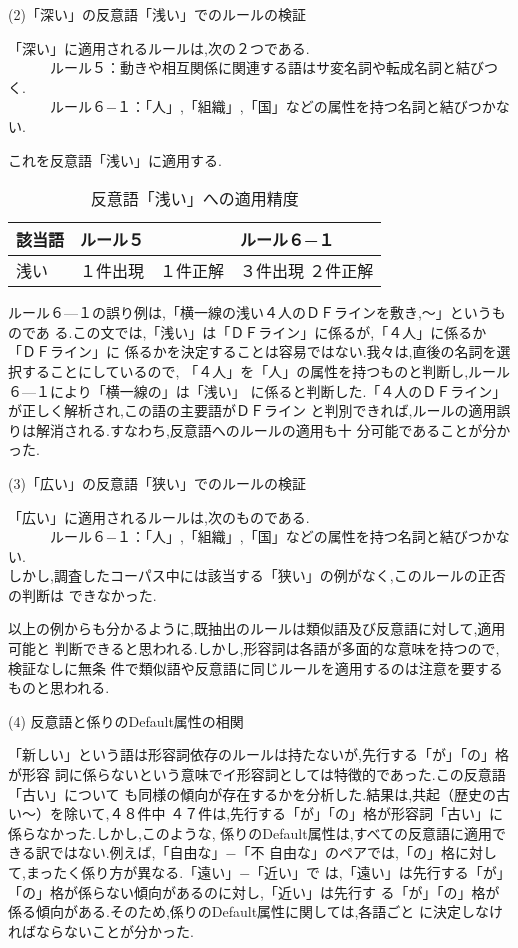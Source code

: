 \noindent
(2)「深い」の反意語「浅い」でのルールの検証

「深い」に適用されるルールは,次の２つである.\\
　　　ルール５：動きや相互関係に関連する語はサ変名詞や転成名詞と結びつく.\\
　　　ルール６−１：「人」,「組織」,「国」などの属性を持つ名詞と結びつかない.

これを反意語「浅い」に適用する.
\begin{table}[h]
\caption{反意語「浅い」への適用精度}
\begin{center}
  \begin{tabular}{|l|l|l|} \hline
    該当語 & ルール５ & ルール６−１\\ \hline
    浅い & １件出現　１件正解 & ３件出現 ２件正解\\ \hline
  \end{tabular}
\end{center}
\end{table}

ルール６—１の誤り例は,「横一線の浅い４人のＤＦラインを敷き,〜」というものであ
る.この文では,「浅い」は「ＤＦライン」に係るが,「４人」に係るか「ＤＦライン」に
係るかを決定することは容易ではない.我々は,直後の名詞を選択することにしているので,
「４人」を「人」の属性を持つものと判断し,ルール６—１により「横一線の」は「浅い」
に係ると判断した.「４人のＤＦライン」が正しく解析され,この語の主要語がＤＦライン
と判別できれば,ルールの適用誤りは解消される.すなわち,反意語へのルールの適用も十
分可能であることが分かった.
\vspace{.5\baselineskip}

\noindent
(3)「広い」の反意語「狭い」でのルールの検証

「広い」に適用されるルールは,次のものである.\\
　　　ルール６−１：「人」,「組織」,「国」などの属性を持つ名詞と結びつかない.\\
しかし,調査したコーパス中には該当する「狭い」の例がなく,このルールの正否の判断は
できなかった.

以上の例からも分かるように,既抽出のルールは類似語及び反意語に対して,適用可能と
判断できると思われる.しかし,形容詞は各語が多面的な意味を持つので,検証なしに無条
件で類似語や反意語に同じルールを適用するのは注意を要するものと思われる.
\vspace{.5\baselineskip}

\noindent
(4) 反意語と係りのDefault属性の相関

「新しい」という語は形容詞依存のルールは持たないが,先行する「が」「の」格が形容
詞に係らないという意味でイ形容詞としては特徴的であった.この反意語「古い」について
も同様の傾向が存在するかを分析した.結果は,共起（歴史の古い〜）を除いて,４８件中
４７件は,先行する「が」「の」格が形容詞「古い」に係らなかった.しかし,このような,
係りのDefault属性は,すべての反意語に適用できる訳ではない.例えば,「自由な」−「不
自由な」のペアでは,「の」格に対して,まったく係り方が異なる.「遠い」−「近い」で
は,「遠い」は先行する「が」「の」格が係らない傾向があるのに対し,「近い」は先行す
る「が」「の」格が係る傾向がある.そのため,係りのDefault属性に関しては,各語ごと
に決定しなければならないことが分かった.

